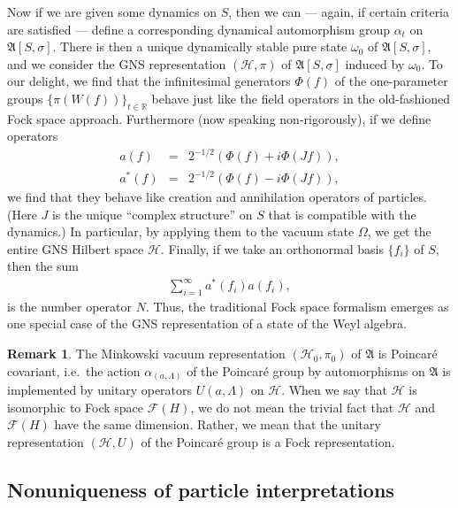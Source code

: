 \documentclass[12pt]{article}
\newcommand{\alg}[1]{\mathfrak{#1}}
\theoremstyle{definition}
\theoremstyle{definition}
\newtheorem{note}[thm]{Remark}
\theoremstyle{remark}
\def\2#1{{\mathcal #1}}
\def\7#1{{\mathbb #1}}
\def\al#1{{\mathfrak #1}}
\def\a{\alpha} \def\b{\beta} \def\g{\gamma} \def\d{\delta}
\def\om{\omega} \def\Om{\Omega} \def\dd{\partial} \def\D{\Delta}
\begin{document}
Now if we are given some dynamics on $S$, then we can --- again, if
certain criteria are satisfied --- define a corresponding dynamical
automorphism group $\a _t$ on $\alg{A}[S,\sigma ]$.  There is then a
unique dynamically stable pure state $\om _0$ of $\alg{A}[S,\sigma ]$,
and we consider the GNS representation $(\2H ,\pi )$ of
$\alg{A}[S,\sigma ]$ induced by $\om _0$.  To our delight, we find
that the infinitesimal generators $\Phi (f)$ of the one-parameter
groups $\{ \pi (W(f)) \}_{t\in \7R}$ behave just like the field
operators in the old-fashioned Fock space approach.  Furthermore (now
speaking non-rigorously), if we define operators
\begin{eqnarray*} 
  a(f) &=& 2^{-1/2}\left( \Phi (f)+i\Phi (Jf) \right) , \\
  a^*(f) &=& 2^{-1/2}\left( \Phi (f)-i\Phi (Jf) \right) ,
\end{eqnarray*} 
we find that they behave like creation and annihilation operators of
particles.  (Here $J$ is the unique ``complex structure'' on $S$ that
is compatible with the dynamics.)  In particular, by applying them to
the vacuum state $\Om$, we get the entire GNS Hilbert space $\2H$.
Finally, if we take an orthonormal basis $\{ f_i\}$ of $S$, then the
sum
\begin{eqnarray*} \sum _{i=1}^{\infty} a ^*(f_i)a(f_ i) ,\end{eqnarray*}
is the number operator $N$.  Thus, the traditional Fock space
formalism emerges as one special case of the GNS representation of a
state of the Weyl algebra.

\begin{note} The Minkowski vacuum representation $(\2H _0,\pi _0 )$ of
  $\al A$ is Poincar{\'e} covariant, i.e.\ the action $\a _{(a,\Lambda
    )}$ of the Poincar{\'e} group by automorphisms on $\al A$ is
  implemented by unitary operators $U(a,\Lambda )$ on $\2H$.  When we
  say that $\2H$ is isomorphic to Fock space $\2F (H)$, we do not mean
  the trivial fact that $\2H$ and $\2F (H)$ have the same dimension.
  Rather, we mean that the unitary representation $(\2H ,U)$ of the
  Poincar{\'e} group is a Fock representation.  \end{note}


\subsection{Nonuniqueness of particle interpretations}
\end{document}

